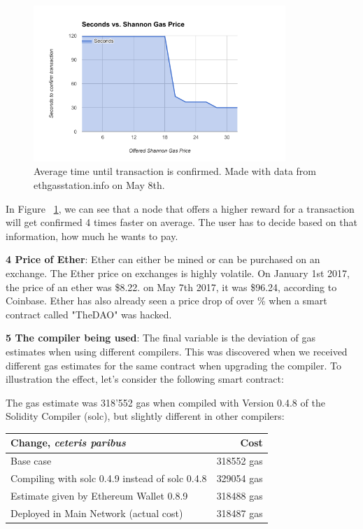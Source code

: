 \begin{figure}[H]
\centering
\includegraphics[width=0.85\textwidth]{gas-vs-transaction-time.png}
\caption{Average time until transaction is confirmed. Made with data from ethgasstation.info on May 8th.}
\label{fig:gas}
\end{figure}

In Figure ~\ref{fig:gas}, we can see that a node that offers a higher reward for a transaction will get confirmed 4 times faster on average. The user has to decide based on that information, how much he wants to pay.

\textbf{4 Price of Ether}: Ether can either be mined or can be purchased on an exchange. The Ether price on exchanges is highly volatile. On January 1st 2017, the price of an ether was \$8.22. on May 7th 2017, it was \$96.24, according to Coinbase. Ether has also already seen a price drop of over \% when a smart contract called "TheDAO" was hacked.

\textbf{5 The compiler being used}: The final variable is the deviation of gas estimates when using different compilers. This was discovered when we received different gas estimates for the same contract when upgrading the compiler. To illustration the effect, let's consider the following smart contract:



The gas estimate was 318'552 gas when compiled with Version 0.4.8 of the Solidity Compiler (solc), but slightly different in other compilers:

\begin{center}
  \begin{tabular}{ l | r }
    \hline
    \textbf{Change, \textit{ceteris paribus}} & \textbf{Cost} \\ \hline
    Base case & 318552 gas \\ \hline
    Compiling with solc 0.4.9 instead of solc 0.4.8 & 329054 gas \\ \hline
    Estimate given by Ethereum Wallet 0.8.9 & 318488 gas \\ \hline
    Deployed in Main Network (actual cost) & 318487 gas \\
    \hline
  \end{tabular}
\end{center}

